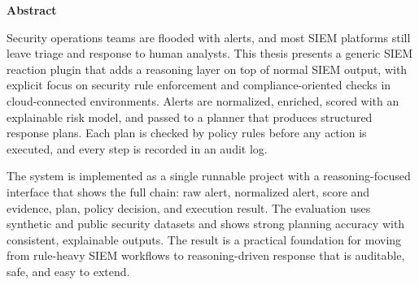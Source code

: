 \cleardoublepage
\newpage
\thispagestyle{empty}

{}

\begin{center}\huge \textbf{Abstract}\end{center}
\noindent Security operations teams are flooded with alerts, and most SIEM platforms still leave triage and response to human analysts. This thesis presents a generic SIEM reaction plugin that adds a reasoning layer on top of normal SIEM output, with explicit focus on security rule enforcement and compliance-oriented checks in cloud-connected environments. Alerts are normalized, enriched, scored with an explainable risk model, and passed to a planner that produces structured response plans. Each plan is checked by policy rules before any action is executed, and every step is recorded in an audit log.
\par\noindent The system is implemented as a single runnable project with a reasoning-focused interface that shows the full chain: raw alert, normalized alert, score and evidence, plan, policy decision, and execution result. The evaluation uses synthetic and public security datasets and shows strong planning accuracy with consistent, explainable outputs. The result is a practical foundation for moving from rule-heavy SIEM workflows to reasoning-driven response that is auditable, safe, and easy to extend.
